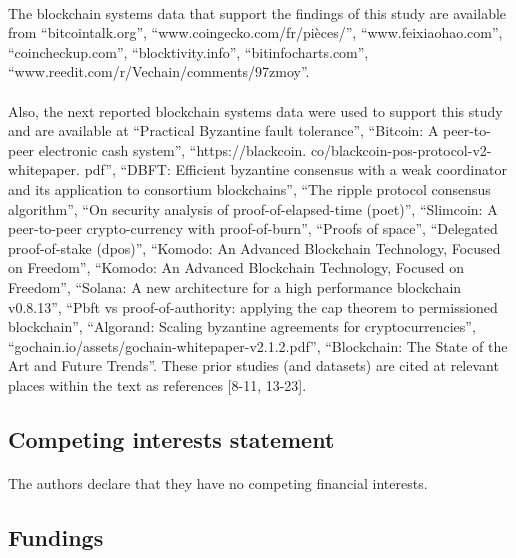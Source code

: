 \documentclass[doublespacing]{bmcart}
\begin{document}
\begin{CJK*}{UTF8}{gbsn}
\paragraph{}
	The blockchain systems data that support the findings of this study are available from ``bitcointalk.org'', ``www.coingecko.com/fr/pièces/'', ``www.feixiaohao.com'', ``coincheckup.com'', ``blocktivity.info'', ``bitinfocharts.com'', \\``www.reedit.com/r/Vechain/comments/97zmoy''.
\paragraph{}
	Also, the next reported blockchain systems data were used to support this study and are available at ``Practical Byzantine fault tolerance'', ``Bitcoin: A peer-to-peer electronic cash system'', ``https://blackcoin. co/blackcoin-pos-protocol-v2-whitepaper. pdf'', ``DBFT: Efficient byzantine consensus with a weak coordinator and its application to consortium blockchains'', ``The ripple protocol consensus algorithm'', ``On security analysis of proof-of-elapsed-time (poet)'', ``Slimcoin: A peer-to-peer crypto-currency with proof-of-burn'', ``Proofs of space'', ``Delegated proof-of-stake (dpos)'', ``Komodo: An Advanced Blockchain Technology, Focused on Freedom'', ``Komodo: An Advanced Blockchain Technology, Focused on Freedom'', ``Solana: A new architecture for a high
performance blockchain v0.8.13'', ``Pbft vs proof-of-authority: applying the cap theorem to permissioned blockchain'', ``Algorand: Scaling byzantine agreements for cryptocurrencies'', ``gochain.io/assets/gochain-whitepaper-v2.1.2.pdf'', ``Blockchain: The State of the Art and Future Trends''. These prior studies (and datasets) are cited at relevant places within the text as references [8-11, 13-23].
\begin{center}
	\subsection*{Competing interests statement}
\end{center}
\paragraph{}
The authors declare that they have no competing financial interests.
\begin{center}
	\subsection*{Fundings}
\end{center}

\end{CJK*}
\end{document}

